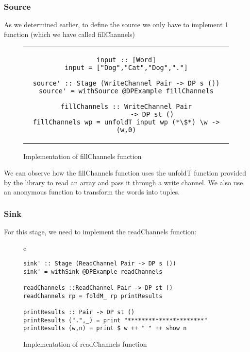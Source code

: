\subsubsection*{Source}
As we determined earlier, to define the source we only have to implement 1 function (which we have called fillChannels)

\begin{figure}[H]
    \begin{tabular}{c}
        \begin{lstlisting}
input :: [Word]
input = ["Dog","Cat","Dog","."]

source' :: Stage (WriteChannel Pair -> DP s ())
source' = withSource @DPExample fillChannels

fillChannels :: WriteChannel Pair
             -> DP st ()
fillChannels wp = unfoldT input wp (*\$*) \w -> (w,0)
        \end{lstlisting}
    \end{tabular}
    \caption[{[Code]} Implementation 2]{Implementation of fillChannels function}
    \label{fig:HC17}
\end{figure}

We can observe how the fillChannels function uses the unfoldT function provided by the library to read an array and pass it through a write channel.
We also use an anonymous function to transform the words into tuples.

\subsubsection*{Sink}
For this stage, we need to implement the readChannels function:

\begin{figure}[H]
    \begin{tabular}{c}
        \begin{lstlisting}
sink' :: Stage (ReadChannel Pair -> DP s ())
sink' = withSink @DPExample readChannels

readChannels ::ReadChannel Pair -> DP st ()
readChannels rp = foldM_ rp printResults

printResults :: Pair -> DP st ()
printResults (".",_) = print "**********************"
printResults (w,n) = print $ w ++ " " ++ show n

        \end{lstlisting}
    \end{tabular}
    \caption[{[Code]} Implementation 3]{Implementation of readChannels function}
    \label{fig:HC18}
\end{figure}

